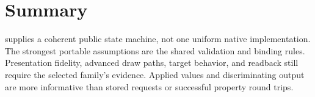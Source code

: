 \section{Summary}

 supplies a coherent public state machine, not one uniform native
implementation. The strongest portable assumptions are the shared validation and binding
rules. Presentation fidelity, advanced draw paths, target behavior, and readback still require
the selected family's evidence. Applied values and discriminating output are more informative
than stored requests or successful property round trips.
